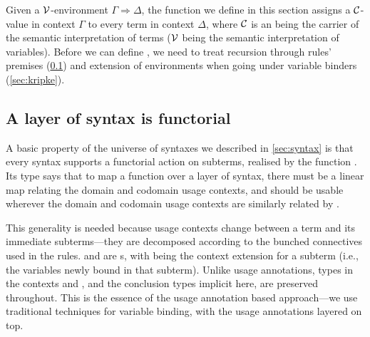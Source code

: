 Given a $\mathcal V$-environment $\Gamma \Rightarrow \Delta$, the function
 we define in this section assigns a
$\mathcal C$-value in context $\Gamma$ to every term in context $\Delta$,
where $\mathcal C$ is an  being the carrier of the
semantic interpretation of terms ($\mathcal V$ being the semantic
interpretation of variables). Before we can define
, we need to treat recursion through rules'
premises (\cref{sec:functorial}) and extension of environments when
going under variable binders (\cref{sec:kripke}).





\subsection{A layer of syntax is functorial}\label{sec:functorial}

A basic property of the universe of syntaxes we described in \cref{sec:syntax}
is that every syntax supports a functorial action on subterms, realised by the function .
Its type says that to map a function 
over a layer of syntax, there must be a linear map  relating the
domain and codomain usage contexts, and  should be usable
wherever the domain and codomain usage contexts are similarly related by
.


This generality is needed because usage contexts change between
a term and its immediate subterms---they are decomposed according to the bunched connectives used in the rules.
 and  are s, with
\AgdaBound{$\Theta$} being the context extension for a subterm (i.e., the
variables newly bound in that subterm).
Unlike usage annotations, types in the contexts \AgdaBound{$\gamma$} and \AgdaBound{$\delta$}, and the conclusion types implicit here, are preserved throughout.
This is the essence of the usage annotation based approach---we use traditional techniques for variable binding, with the usage annotations layered on top.

